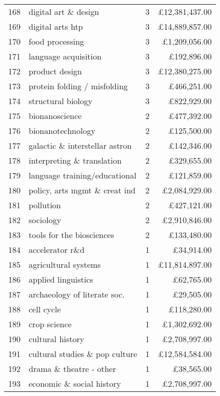 \begin{spacing}{0.9}
\begin{longtable}[c]{r|>{\raggedleft\arraybackslash}m{6.5cm}|>{\raggedleft\arraybackslash}m{1.9cm}|r}
{168} & {digital art \& design} & {3} & {\pounds12,381,437.00}\\
{169} & {digital arts htp} & {3} & {\pounds14,889,857.00}\\
{170} & {food processing} & {3} & {\pounds1,209,056.00}\\
{171} & {language acquisition} & {3} & {\pounds192,896.00}\\
{172} & {product design} & {3} & {\pounds12,380,275.00}\\
{173} & {protein folding / misfolding} & {3} & {\pounds466,251.00}\\
{174} & {structural biology} & {3} & {\pounds822,929.00}\\
{175} & {bionanoscience} & {2} & {\pounds477,392.00}\\
{176} & {bionanotechnology} & {2} & {\pounds125,500.00}\\
{177} & {galactic \& interstellar astron} & {2} & {\pounds142,346.00}\\
{178} & {interpreting \& translation} & {2} & {\pounds329,655.00}\\
{179} & {language training/educational} & {2} & {\pounds121,859.00}\\
{180} & {policy, arts mgmt \& creat ind} & {2} & {\pounds2,084,929.00}\\
{181} & {pollution} & {2} & {\pounds427,121.00}\\
{182} & {sociology} & {2} & {\pounds2,910,846.00}\\
{183} & {tools for the biosciences} & {2} & {\pounds133,480.00}\\
{184} & {accelerator r\&d} & {1} & {\pounds34,914.00}\\
{185} & {agricultural systems} & {1} & {\pounds11,814,897.00}\\
{186} & {applied linguistics} & {1} & {\pounds62,765.00}\\
{187} & {archaeology of literate soc.} & {1} & {\pounds29,505.00}\\
{188} & {cell cycle} & {1} & {\pounds118,280.00}\\
{189} & {crop science} & {1} & {\pounds1,302,692.00}\\
{190} & {cultural history} & {1} & {\pounds2,708,997.00}\\
{191} & {cultural studies \& pop culture} & {1} & {\pounds12,584,584.00}\\
{192} & {drama \& theatre - other} & {1} & {\pounds38,565.00}\\
{193} & {economic \& social history} & {1} & {\pounds2,708,997.00}\\

\end{longtable}
\end{spacing}

